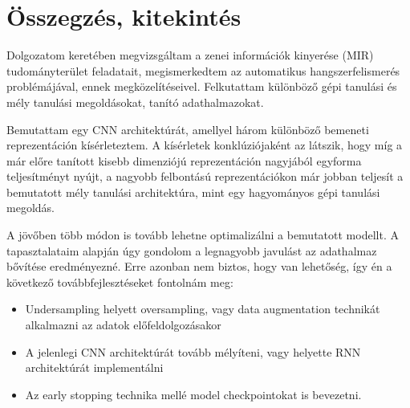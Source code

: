 \chapter{Összegzés, kitekintés}
\label{ch:sum}

Dolgozatom keretében megvizsgáltam a zenei információk kinyerése (MIR) tudományterület feladatait, megismerkedtem az automatikus hangszerfelismerés problémájával, ennek megközelítéseivel. Felkutattam különböző gépi tanulási és mély tanulási megoldásokat, tanító adathalmazokat.

Bemutattam egy CNN architektúrát, amellyel három különböző bemeneti reprezentáción kísérleteztem. A kísérletek konklúziójaként az látszik, hogy míg a már előre tanított kisebb dimenziójú reprezentáción nagyjából egyforma teljesítményt nyújt, a nagyobb felbontású reprezentációkon már jobban teljesít a bemutatott mély tanulási architektúra, mint egy hagyományos gépi tanulási megoldás.

A jövőben több módon is tovább lehetne optimalizálni a bemutatott modellt. A tapasztalataim alapján úgy gondolom a legnagyobb javulást az adathalmaz bővítése eredményezné. Erre azonban nem biztos, hogy van lehetőség, így én a következő továbbfejlesztéseket fontolnám meg:
\begin{itemize}
 \item Undersampling helyett oversampling, vagy data augmentation technikát alkalmazni az adatok előfeldolgozásakor
 \item A jelenlegi CNN architektúrát tovább mélyíteni, vagy helyette RNN architektúrát implementálni
 \item Az early stopping technika mellé model checkpointokat is bevezetni.
\end{itemize}

